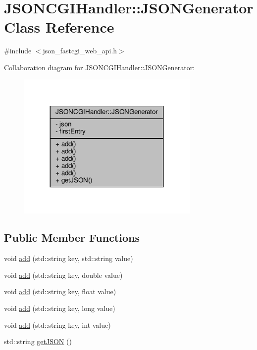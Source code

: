 \hypertarget{classJSONCGIHandler_1_1JSONGenerator}{}\section{J\+S\+O\+N\+C\+G\+I\+Handler\+:\+:J\+S\+O\+N\+Generator Class Reference}
\label{classJSONCGIHandler_1_1JSONGenerator}


{\ttfamily \#include $<$json\+\_\+fastcgi\+\_\+web\+\_\+api.\+h$>$}



Collaboration diagram for J\+S\+O\+N\+C\+G\+I\+Handler\+:\+:J\+S\+O\+N\+Generator\+:
\nopagebreak
\begin{figure}[H]
\begin{center}
\leavevmode
\includegraphics[width=251pt]{classJSONCGIHandler_1_1JSONGenerator__coll__graph}
\end{center}
\end{figure}
\subsection*{Public Member Functions}
\begin{DoxyCompactItemize}
\item 
void \hyperlink{classJSONCGIHandler_1_1JSONGenerator_a191efd00967cbace0d9ddfedea39cd9b}{add} (std\+::string key, std\+::string value)
\item 
void \hyperlink{classJSONCGIHandler_1_1JSONGenerator_aa25099deb2442335298ab1c021f36910}{add} (std\+::string key, double value)
\item 
void \hyperlink{classJSONCGIHandler_1_1JSONGenerator_a2192849b22341653a138bb63da6c6c9a}{add} (std\+::string key, float value)
\item 
void \hyperlink{classJSONCGIHandler_1_1JSONGenerator_afc3e9374b0e49ca1f701bd22bbd4cd92}{add} (std\+::string key, long value)
\item 
void \hyperlink{classJSONCGIHandler_1_1JSONGenerator_a87fe5c75b46f9822255535a61f15ad4b}{add} (std\+::string key, int value)
\item 
std\+::string \hyperlink{classJSONCGIHandler_1_1JSONGenerator_afec28cd80e562955e2cd8cdb92d86205}{get\+J\+S\+ON} ()
\end{DoxyCompactItemize}
